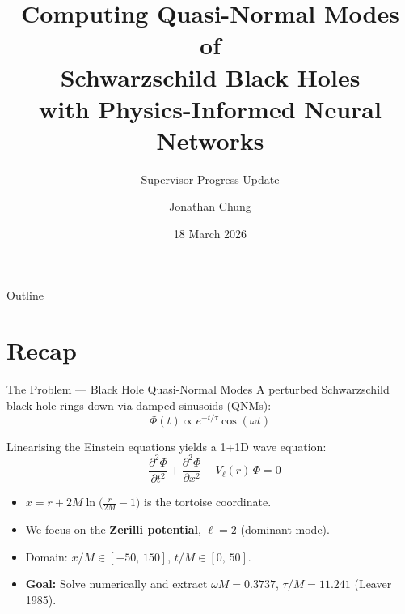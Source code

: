 \documentclass[aspectratio=169, 11pt]{beamer}
\title[QNMs with PINNs]{Computing Quasi-Normal Modes of\\Schwarzschild Black Holes\\with Physics-Informed Neural Networks}
\subtitle{Supervisor Progress Update}
\author{Jonathan Chung}
\institute{University of Cambridge}
\date{18 March 2026}
\newcommand{\bh}{black hole}
\newcommand{\qnms}{QNMs}
\newcommand{\zer}{Zerilli}
\begin{document}
\begin{frame}
  \titlepage
\end{frame}

\begin{frame}{Outline}
  \tableofcontents
\end{frame}

\section{Recap}

\begin{frame}{The Problem --- Black Hole Quasi-Normal Modes}
  A perturbed Schwarzschild \bh{} rings down via damped sinusoids (\qnms{}):
  \[
    \Phi(t) \propto e^{-t/\tau}\cos(\omega t)
  \]

  Linearising the Einstein equations yields a 1+1D wave equation:
  \[
    -\frac{\partial^2\Phi}{\partial t^2}
    + \frac{\partial^2\Phi}{\partial x^2}
    - V_{\ell}(r)\,\Phi = 0
  \]

  \begin{itemize}
    \item $x = r + 2M\ln\!\bigl(\tfrac{r}{2M}-1\bigr)$ is the tortoise coordinate.
    \item We focus on the \textbf{\zer{} potential}, $\ell = 2$ (dominant mode).
    \item Domain: $x/M \in [-50,\,150]$, \; $t/M \in [0,\,50]$.
    \item \textbf{Goal:} Solve numerically and extract $\omega M = 0.3737$, $\tau/M = 11.241$ (Leaver 1985).
  \end{itemize}
\end{frame}
\end{document}
